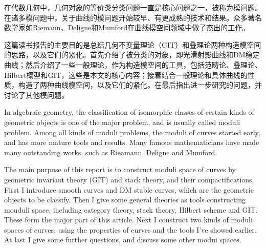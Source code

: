
\begin{cabstract}	
在代数几何中，几何对象的等价类分类问题一直是核心问题之一，被称为模问题。在诸多模问题中，关于曲线的模问题开始较早、有更成熟的技术和结果。众多著名数学家如Riemann、Deligne和Mumford在曲线模空间领域中做了杰出的工作。

这篇读书报告的主要目的是总结几何不变量理论（GIT）和叠理论两种构造模空间的思路，以及它们的紧化。首先介绍了被分类的对象，即光滑射影曲线和DM稳定曲线；然后介绍了一些一般理论，作为构造模空间的工具，包括范畴论、叠理论、Hilbert概型和GIT，这些是本文的核心内容；接着结合一般理论和具体曲线的性质，构造了两种曲线模空间，以及它们的紧化。在最后指出进一步研究的问题，并讨论了其他模问题。
\end{cabstract}

\begin{eabstract}
In algebraic geometry, the classification of isomorphic classes of certain kinds of  geometric objects is one of the major problem, and is usually called moduli problem. Among all kinds of moduli problems, the moduli of curves started early, and has more mature tools and results. Many famous mathematicians have made many outstanding works, such as Rieamann, Deligne and Mumford.

The main purpose of this report is to construct  moduli space of curves by geometric invariant theory (GIT) and stack theory, and their compactifications. First I introduce smooth curves and DM stable curves,  which are the geometric objects to be classify. Then I give some general theories as tools constructing mouduli space, including category theory, stack theory, Hilbert scheme and GIT. These form the major part of this article. Next I construct two kinds of moduli spaces of curves, using the  properties of curves and the tools I've showed earlier. At last I give some further questions, and discuss some other modui spaces. 
\end{eabstract}